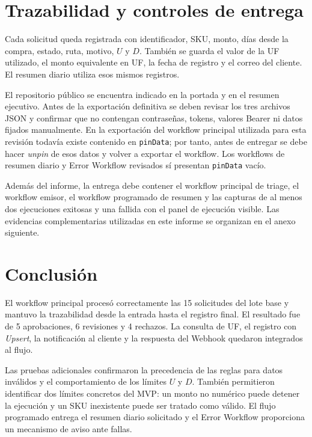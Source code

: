 \documentclass[10pt,a4paper]{article}
\begin{document}
\section{Trazabilidad y controles de entrega}

Cada solicitud queda registrada con identificador, SKU, monto, días desde la compra, estado, ruta, motivo, $U$ y $D$. También se guarda el valor de la UF utilizado, el monto equivalente en UF, la fecha de registro y el correo del cliente. El resumen diario utiliza esos mismos registros.

El repositorio público se encuentra indicado en la portada y en el resumen ejecutivo. Antes de la exportación definitiva se deben revisar los tres archivos JSON y confirmar que no contengan contraseñas, tokens, valores Bearer ni datos fijados manualmente. En la exportación del workflow principal utilizada para esta revisión todavía existe contenido en \texttt{pinData}; por tanto, antes de entregar se debe hacer \textit{unpin} de esos datos y volver a exportar el workflow. Los workflows de resumen diario y Error Workflow revisados sí presentan \texttt{pinData} vacío.

Además del informe, la entrega debe contener el workflow principal de triage, el workflow emisor, el workflow programado de resumen y las capturas de al menos dos ejecuciones exitosas y una fallida con el panel de ejecución visible. Las evidencias complementarias utilizadas en este informe se organizan en el anexo siguiente.

\section*{Conclusión}

El workflow principal procesó correctamente las 15 solicitudes del lote base y mantuvo la trazabilidad desde la entrada hasta el registro final. El resultado fue de 5 aprobaciones, 6 revisiones y 4 rechazos. La consulta de UF, el registro con \textit{Upsert}, la notificación al cliente y la respuesta del Webhook quedaron integrados al flujo.

Las pruebas adicionales confirmaron la precedencia de las reglas para datos inválidos y el comportamiento de los límites $U$ y $D$. También permitieron identificar dos límites concretos del MVP: un monto no numérico puede detener la ejecución y un SKU inexistente puede ser tratado como válido. El flujo programado entrega el resumen diario solicitado y el Error Workflow proporciona un mecanismo de aviso ante fallas.
\end{document}
